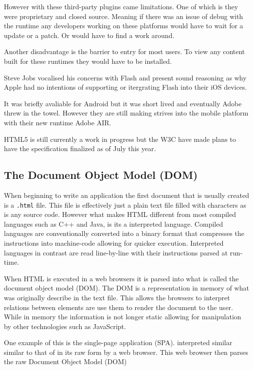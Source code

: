 \documentclass[final]{cmpreport}
\begin{document}
However with these third-party plugins came limitations. One of which is they were proprietary and closed source. Meaning if there was an issue of debug with the runtime any developers working on these platforms would have to wait for a update or a patch. Or would have to find a work around.

Another disadvantage is the barrier to entry for most users. To view any content built for these runtimes they would have to be installed. 

Steve Jobs vocalised his concerns with Flash and present sound reasoning as why Apple had no intentions of supporting or itergrating Flash into their iOS devices.

It was briefly avaliable for Android but it was short lived and eventually Adobe threw in the towel. However they are still making strives into the mobile platform with their new runtime Adobe AIR.

HTML5 is still currently a work in progress but the W3C have made plans to have the specification finalized as of July this year.

\subsection{The Document Object Model (DOM)}
When beginning to write an application the first document that is usually created is a \texttt{.html} file. This file is effectively just a plain text file filled with characters as is any source code. However what makes HTML different from most compiled languages such as C++ and Java, is its a interpreted language. Compiled languages are conventionally converted into a binary format that compresses the instructions into machine-code allowing for quicker execution. Interpreted languages in contrast are read line-by-line with their instructions parsed at run-time.

When HTML is executed in a web browsers it is parsed into what is called the document object model (DOM). The DOM is a representation in memory of what was originally describe in the text file. This allows the browsers to interpret relations between elements are use them to render the document to the user. While in memory the information is not longer static allowing for manipulation by other technologies such as JavaScript.

One example of this is the single-page application (SPA). interpreted similar similar to that of in its raw form by a web browser. This web browser then parses the raw  Document Object Model (DOM)
\end{document}
